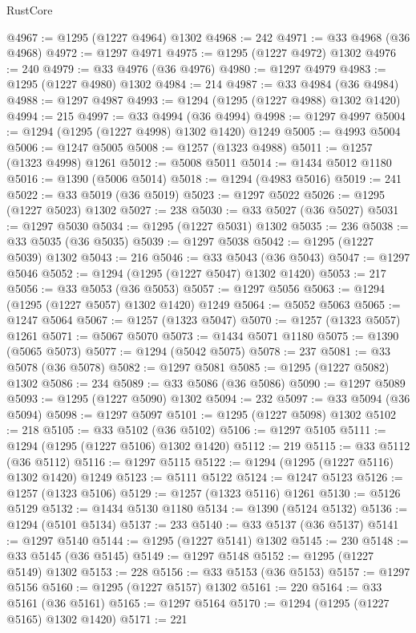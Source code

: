 \begin{lexlean}{RustCore}
\begin{coremodule}
@4967 := @1295 (@1227 @4964) @1302
@4968 := 242
@4971 := @33 @4968 (@36 @4968)
@4972 := @1297 @4971
@4975 := @1295 (@1227 @4972) @1302
@4976 := 240
@4979 := @33 @4976 (@36 @4976)
@4980 := @1297 @4979
@4983 := @1295 (@1227 @4980) @1302
@4984 := 214
@4987 := @33 @4984 (@36 @4984)
@4988 := @1297 @4987
@4993 := @1294 (@1295 (@1227 @4988) @1302 @1420)
@4994 := 215
@4997 := @33 @4994 (@36 @4994)
@4998 := @1297 @4997
@5004 := @1294 (@1295 (@1227 @4998) @1302 @1420) @1249
@5005 := @4993 @5004
@5006 := @1247 @5005
@5008 := @1257 (@1323 @4988)
@5011 := @1257 (@1323 @4998) @1261
@5012 := @5008 @5011
@5014 := @1434 @5012 @1180
@5016 := @1390 (@5006 @5014)
@5018 := @1294 (@4983 @5016)
@5019 := 241
@5022 := @33 @5019 (@36 @5019)
@5023 := @1297 @5022
@5026 := @1295 (@1227 @5023) @1302
@5027 := 238
@5030 := @33 @5027 (@36 @5027)
@5031 := @1297 @5030
@5034 := @1295 (@1227 @5031) @1302
@5035 := 236
@5038 := @33 @5035 (@36 @5035)
@5039 := @1297 @5038
@5042 := @1295 (@1227 @5039) @1302
@5043 := 216
@5046 := @33 @5043 (@36 @5043)
@5047 := @1297 @5046
@5052 := @1294 (@1295 (@1227 @5047) @1302 @1420)
@5053 := 217
@5056 := @33 @5053 (@36 @5053)
@5057 := @1297 @5056
@5063 := @1294 (@1295 (@1227 @5057) @1302 @1420) @1249
@5064 := @5052 @5063
@5065 := @1247 @5064
@5067 := @1257 (@1323 @5047)
@5070 := @1257 (@1323 @5057) @1261
@5071 := @5067 @5070
@5073 := @1434 @5071 @1180
@5075 := @1390 (@5065 @5073)
@5077 := @1294 (@5042 @5075)
@5078 := 237
@5081 := @33 @5078 (@36 @5078)
@5082 := @1297 @5081
@5085 := @1295 (@1227 @5082) @1302
@5086 := 234
@5089 := @33 @5086 (@36 @5086)
@5090 := @1297 @5089
@5093 := @1295 (@1227 @5090) @1302
@5094 := 232
@5097 := @33 @5094 (@36 @5094)
@5098 := @1297 @5097
@5101 := @1295 (@1227 @5098) @1302
@5102 := 218
@5105 := @33 @5102 (@36 @5102)
@5106 := @1297 @5105
@5111 := @1294 (@1295 (@1227 @5106) @1302 @1420)
@5112 := 219
@5115 := @33 @5112 (@36 @5112)
@5116 := @1297 @5115
@5122 := @1294 (@1295 (@1227 @5116) @1302 @1420) @1249
@5123 := @5111 @5122
@5124 := @1247 @5123
@5126 := @1257 (@1323 @5106)
@5129 := @1257 (@1323 @5116) @1261
@5130 := @5126 @5129
@5132 := @1434 @5130 @1180
@5134 := @1390 (@5124 @5132)
@5136 := @1294 (@5101 @5134)
@5137 := 233
@5140 := @33 @5137 (@36 @5137)
@5141 := @1297 @5140
@5144 := @1295 (@1227 @5141) @1302
@5145 := 230
@5148 := @33 @5145 (@36 @5145)
@5149 := @1297 @5148
@5152 := @1295 (@1227 @5149) @1302
@5153 := 228
@5156 := @33 @5153 (@36 @5153)
@5157 := @1297 @5156
@5160 := @1295 (@1227 @5157) @1302
@5161 := 220
@5164 := @33 @5161 (@36 @5161)
@5165 := @1297 @5164
@5170 := @1294 (@1295 (@1227 @5165) @1302 @1420)
@5171 := 221

\end{coremodule}
\end{lexlean}
